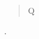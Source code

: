 \documentclass{article}
\newcommand\where{}
\begin{document}
\begin{quote}
Q
\end{quote}
\where.
\end{document}
